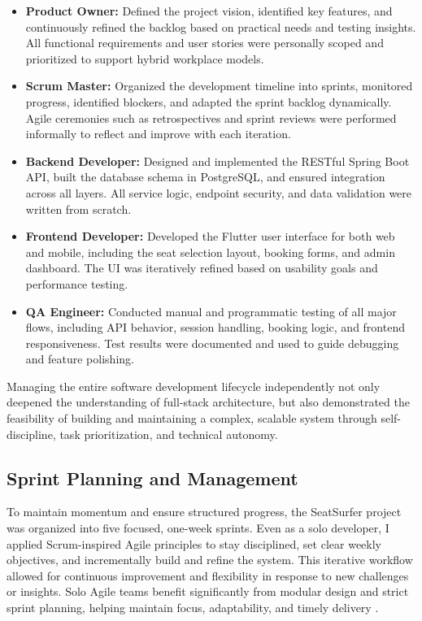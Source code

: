 \documentclass[12pt,a4paper]{report} %
\begin{document}
\begin{itemize}
\item \textbf{Product Owner:}
Defined the project vision, identified key features, and continuously refined the backlog based on practical needs and testing insights. All functional requirements and user stories were personally scoped and prioritized to support hybrid workplace models.
\item \textbf{Scrum Master:}  
Organized the development timeline into sprints, monitored progress, identified blockers, and adapted the sprint backlog dynamically. Agile ceremonies such as retrospectives and sprint reviews were performed informally to reflect and improve with each iteration.

\item \textbf{Backend Developer:}  
Designed and implemented the RESTful Spring Boot API, built the database schema in PostgreSQL, and ensured integration across all layers. All service logic, endpoint security, and data validation were written from scratch.

\item \textbf{Frontend Developer:}  
Developed the Flutter user interface for both web and mobile, including the seat selection layout, booking forms, and admin dashboard. The UI was iteratively refined based on usability goals and performance testing.

\item \textbf{QA Engineer:}  
Conducted manual and programmatic testing of all major flows, including API behavior, session handling, booking logic, and frontend responsiveness. Test results were documented and used to guide debugging and feature polishing.
\end{itemize}

Managing the entire software development lifecycle independently not only deepened the understanding of full-stack architecture, but also demonstrated the feasibility of building and maintaining a complex, scalable system through self-discipline, task prioritization, and technical autonomy.

\subsection{Sprint Planning and Management}

To maintain momentum and ensure structured progress, the SeatSurfer project was organized into five focused, one-week sprints. Even as a solo developer, I applied Scrum-inspired Agile principles to stay disciplined, set clear weekly objectives, and incrementally build and refine the system. This iterative workflow allowed for continuous improvement and flexibility in response to new challenges or insights. Solo Agile teams benefit significantly from modular design and strict sprint planning, helping maintain focus, adaptability, and timely delivery \cite{zhang2023agiletesting}.
\end{document}
